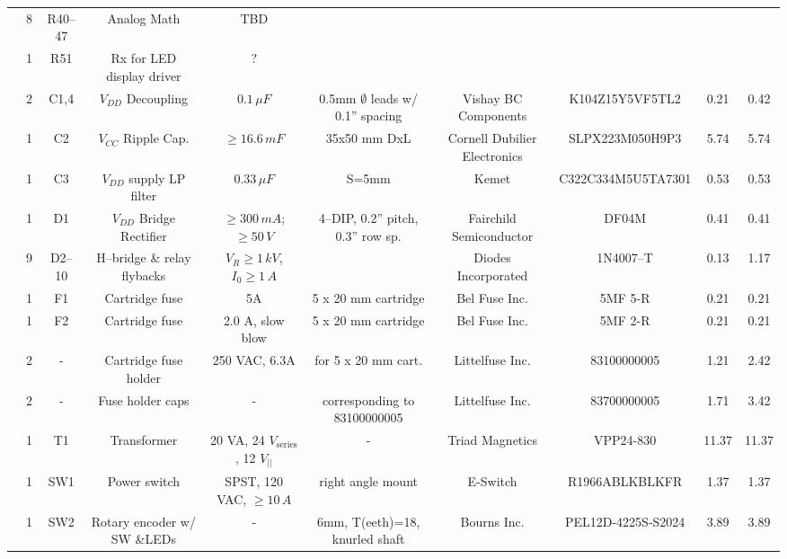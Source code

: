 \documentclass[10pt, twocolumn]{article}
\begin{document}
\begin{center}
\begin{adjustbox}{max width=\textwidth}
\begin{tabular}{c c c c c c c c c c}
	&8	&R40--47	&Analog Math	&TBD			&
	&			&			&		&		\\

	&1	&R51	&Rx for LED display driver	&?		&
	&			&			&		&	\\

	&2	&C1,4		&$V_{DD}$ Decoupling	&$0.1\,\mu F$	&0.5mm $\emptyset$ leads w/ 0.1'' spacing
	&Vishay BC Components	&K104Z15Y5VF5TL2	&0.21		&0.42		\\

	&1	&C2		&$V_{CC}$ Ripple Cap.	&$\geq16.6\,mF$	&35x50 mm DxL		
	&Cornell Dubilier Electronics	&SLPX223M050H9P3	&5.74		&5.74	\\

	&1	&C3		&$V_{DD}$ supply LP filter	&$0.33\,\mu F$	&S=5mm		
	&Kemet			&C322C334M5U5TA7301	&0.53		&0.53		\\

	&1	&D1		&$V_{DD}$ Bridge Rectifier	&$\geq 300\,mA$; $\geq 50\,V$	&4--DIP, 0.2'' pitch, 0.3'' row sp.
	&Fairchild Semiconductor	&DF04M			&0.41		&0.41	\\

	&9	&D2--10	&H--bridge \& relay flybacks	&$V_{R}\geq1\,kV$, $I_{0}\geq 1\,A$	&
	&Diodes Incorporated	&1N4007--T		&0.13		&1.17	\\

	&1	&F1	&Cartridge fuse		&5A			&5 x 20 mm cartridge
	&Bel Fuse Inc.		&5MF 5-R		&0.21		&0.21	\\

	&1	&F2	&Cartridge fuse		&2.0 A, slow blow	&5 x 20 mm cartridge
	&Bel Fuse Inc.		&5MF 2-R		&0.21		&0.21	\\

	&2	&-	&Cartridge fuse holder	&250 VAC, 6.3A			&for 5 x 20 mm cart.
	&Littelfuse Inc.	&83100000005		&1.21		&2.42	\\

	&2	&-	&Fuse holder caps	&-				&corresponding to 83100000005
	&Littelfuse Inc.	&83700000005		&1.71		&3.42	\\

	&1	&T1	&Transformer		&20 VA, 24 $V_{\textrm{series}}$, 12 $V_{||}$	&-
	&Triad Magnetics	&VPP24-830		&11.37		&11.37	\\

	&1	&SW1	&Power switch			&SPST, 120 VAC, $\geq10\,A$	&right angle mount
	&E-Switch		&R1966ABLKBLKFR		&1.37		&1.37	\\

	&1	&SW2	&Rotary encoder w/ SW \&LEDs	&-	&6mm, T(eeth)=18, knurled shaft
	&Bourns Inc.		&PEL12D-4225S-S2024	&3.89		&3.89	\\


\end{tabular}
\end{adjustbox}
\end{center}
\end{document}
